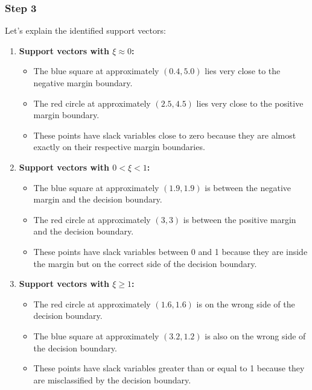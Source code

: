 \documentclass{article}
\begin{document}
\subsubsection*{Step 3}
\parbox{\textwidth}{
Let's explain the identified support vectors:

\begin{enumerate}
    \item \textbf{Support vectors with $\xi \approx 0$:}
    \begin{itemize}
        \item The blue square at approximately $(0.4, 5.0)$ lies very close to the negative margin boundary.
        \item The red circle at approximately $(2.5, 4.5)$ lies very close to the positive margin boundary.
        \item These points have slack variables close to zero because they are almost exactly on their respective margin boundaries.
    \end{itemize}
    
    \item \textbf{Support vectors with $0 < \xi < 1$:}
    \begin{itemize}
        \item The blue square at approximately $(1.9, 1.9)$ is between the negative margin and the decision boundary.
        \item The red circle at approximately $(3, 3)$ is between the positive margin and the decision boundary.
        \item These points have slack variables between 0 and 1 because they are inside the margin but on the correct side of the decision boundary.
    \end{itemize}
    
    \item \textbf{Support vectors with $\xi \geq 1$:}
    \begin{itemize}
        \item The red circle at approximately $(1.6, 1.6)$ is on the wrong side of the decision boundary.
        \item The blue square at approximately $(3.2, 1.2)$ is also on the wrong side of the decision boundary.
        \item These points have slack variables greater than or equal to 1 because they are misclassified by the decision boundary.
    \end{itemize}
\end{enumerate}
}
\end{document}
